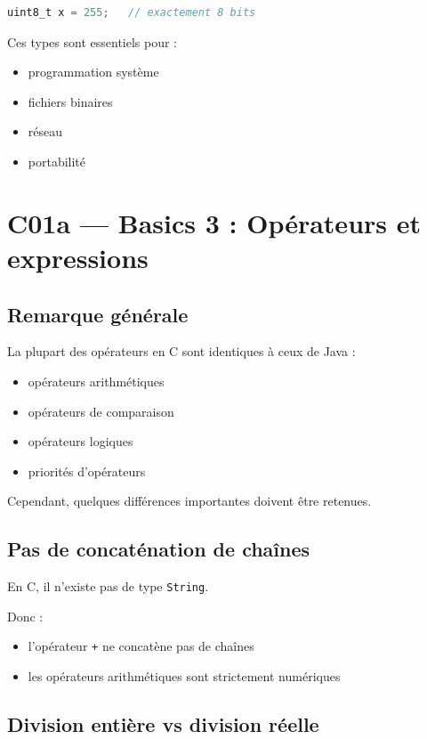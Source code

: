 \begin{lstlisting}[language=C]
uint8_t x = 255;   // exactement 8 bits
\end{lstlisting}

Ces types sont essentiels pour :

\begin{itemize}
    \item programmation système
    \item fichiers binaires
    \item réseau
    \item portabilité
\end{itemize}

\section{C01a — Basics 3 : Opérateurs et expressions}

\subsection{Remarque générale}

La plupart des opérateurs en C sont identiques à ceux de Java :

\begin{itemize}
    \item opérateurs arithmétiques
    \item opérateurs de comparaison
    \item opérateurs logiques
    \item priorités d’opérateurs
\end{itemize}

Cependant, quelques différences importantes doivent être retenues.

\subsection{Pas de concaténation de chaînes}

En C, il n’existe pas de type \texttt{String}.

Donc :

\begin{itemize}
    \item l’opérateur \texttt{+} ne concatène pas de chaînes
    \item les opérateurs arithmétiques sont strictement numériques
\end{itemize}

\subsection{Division entière vs division réelle}

